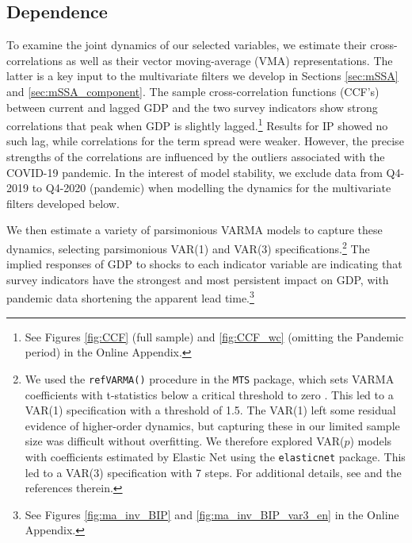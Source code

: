 \documentclass[11pt,a4paper]{article}
\begin{document}

\subsection{Dependence}
To examine the joint dynamics of our selected variables, we estimate their cross-correlations as well as their vector moving-average (VMA) representations. The latter is a key input to the multivariate filters we develop in Sections \ref{sec:mSSA} and \ref{sec:mSSA_component}. 
The sample cross-correlation functions (CCF's) between current and lagged GDP and the two survey indicators show strong correlations that peak when GDP is slightly lagged.\footnote{See Figures \ref{fig:CCF} (full sample) and \ref{fig:CCF_wc} (omitting the Pandemic period) in the Online Appendix.} Results for IP showed no such lag, while correlations for the term spread were weaker. However, the precise strengths of the correlations are influenced by the outliers associated with the COVID-19 pandemic. In the interest of model stability, we exclude data from Q4-2019 to Q4-2020 (pandemic) when modelling the dynamics for the multivariate filters developed below. 

We then estimate a variety of parsimonious VARMA models to capture these dynamics, selecting parsimonious VAR(1) and VAR(3) specifications.\footnote{We used the \texttt{refVARMA()} procedure in the \cite{MTSpackage} \texttt{MTS} package, which sets VARMA coefficients with t-statistics below a critical threshold to zero \citep[see][]{tsay2013multivariate}. This led to a VAR(1) specification with a threshold of 1.5. The VAR(1) left some residual evidence of higher-order dynamics, but capturing these in our limited sample size was difficult without overfitting. We therefore explored VAR($p$) models with coefficients estimated by Elastic Net using the \cite{ElasticNet} \texttt{elasticnet} package. This led to a VAR(3) specification with 7 steps. For additional details, see \cite{ElasticNet} and the references therein.} The implied responses of GDP to shocks to each indicator variable are indicating that survey indicators have the strongest and most persistent impact on GDP, with pandemic data shortening the apparent lead time.\footnote{See Figures \ref{fig:ma_inv_BIP} and \ref{fig:ma_inv_BIP_var3_en} in the Online Appendix.} 

%
\end{document}
